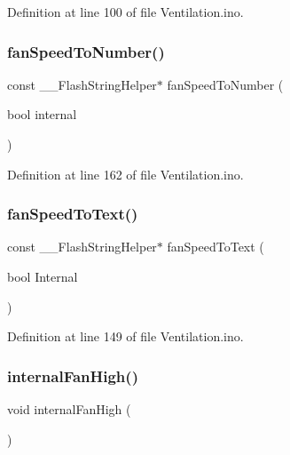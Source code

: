 Definition at line 100 of file Ventilation.\+ino.

\mbox{\label{_ventilation_8ino_a63898058f3b75c4fd34dae5a1bf036bd}} 
\subsubsection{\texorpdfstring{fanSpeedToNumber()}{fanSpeedToNumber()}}
{\footnotesize\ttfamily const \+\_\+\+\_\+\+Flash\+String\+Helper$\ast$ fan\+Speed\+To\+Number (\begin{DoxyParamCaption}\item[{bool}]{internal }\end{DoxyParamCaption})}



Definition at line 162 of file Ventilation.\+ino.

\mbox{\label{_ventilation_8ino_a2da231901bf664049d37a5f4604eec2e}} 
\subsubsection{\texorpdfstring{fanSpeedToText()}{fanSpeedToText()}}
{\footnotesize\ttfamily const \+\_\+\+\_\+\+Flash\+String\+Helper$\ast$ fan\+Speed\+To\+Text (\begin{DoxyParamCaption}\item[{bool}]{Internal }\end{DoxyParamCaption})}



Definition at line 149 of file Ventilation.\+ino.

\mbox{\label{_ventilation_8ino_a54c4008318485af1989e3c94cddcc80c}} 
\subsubsection{\texorpdfstring{internalFanHigh()}{internalFanHigh()}}
{\footnotesize\ttfamily void internal\+Fan\+High (\begin{DoxyParamCaption}{ }\end{DoxyParamCaption})}



